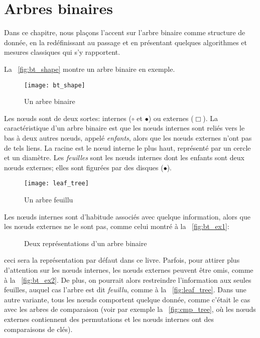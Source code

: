 \chapter{Arbres binaires}

Dans ce chapitre, nous plaçons l'accent sur l'arbre binaire
comme structure de donnée, en la redéfinissant au passage et en
présentant quelques algorithmes et mesures classiques qui s'y
rapportent.

La \fig~\vref{fig:bt_shape} montre un arbre binaire en exemple.
\begin{figure}
\centering
\texttt{[image: bt\_shape]}
\caption{Un arbre binaire}
\label{fig:bt_shape}
\end{figure}
Les nœuds sont de deux sortes: internes (\(\circ\) et \(\bullet\)) ou
externes (\(\scriptstyle
\Box\)). La caractéristique d'un arbre binaire est que les nœuds
internes sont reliés vers le bas à deux autres nœuds, appelé
\emph{enfants}, alors que les nœuds
externes n'ont pas de tels liens. La
racine est le nœud interne le plus
haut, représenté par un cercle et un diamètre. Les
\emph{feuilles} sont les nœuds
internes dont les enfants sont deux nœuds externes; elles sont
figurées par des disques (\(\bullet\)).

%
\begin{figure}
\centering
\texttt{[image: leaf\_tree]}
\caption{Un arbre feuillu}
\label{fig:leaf_tree}
\end{figure}
Les nœuds internes sont d'habitude associés avec quelque
information, alors que les nœuds externes ne le sont pas, comme
celui montré à la \fig~\vref{fig:bt_ex1}:
\begin{figure}
\centering
{}
\qquad
{}
\caption{Deux représentations d'un arbre binaire}
\label{fig:bt_ex}
\end{figure}
ceci sera la représentation par défaut dans ce livre. Parfois, pour
attirer plus d'attention sur les nœuds internes, les nœuds
externes peuvent être omis, comme à la \fig~\vref{fig:bt_ex2}. De
plus, on pourrait alors restreindre l'information aux seules feuilles,
auquel cas l'arbre est dit \emph{feuillu}, comme à la \fig~\vref{fig:leaf_tree}. Dans une autre
variante, tous les nœuds comportent quelque donnée, comme c'était
le cas avec les arbres de comparaison (voir par exemple la
\fig~\vref{fig:cmp_tree}, où les nœuds externes contiennent des
permutations et les nœuds internes ont des comparaisons de clés).

